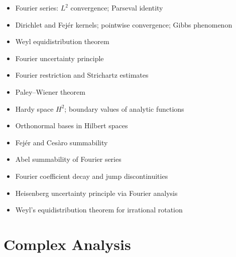 \documentclass{amsart}
\begin{document}
\begin{itemize}
  \item Fourier series: $L^2$ convergence; Parseval identity
  \item Dirichlet and Fej\'er kernels; pointwise convergence; Gibbs phenomenon
  \item Weyl equidistribution theorem
  \item Fourier uncertainty principle
  \item Fourier restriction and Strichartz estimates
  \item Paley--Wiener theorem
  \item Hardy space $H^2$; boundary values of analytic functions
  \item Orthonormal bases in Hilbert spaces
  \item Fej\'er and Ces\`aro summability
  \item Abel summability of Fourier series
  \item Fourier coefficient decay and jump discontinuities
  \item Heisenberg uncertainty principle via Fourier analysis
  \item Weyl's equidistribution theorem for irrational rotation
\end{itemize}

\section{Complex Analysis}
\end{document}
